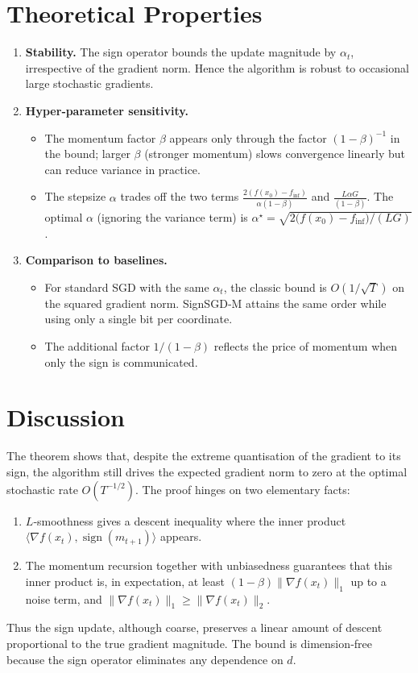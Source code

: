 \documentclass{article}
\begin{document}
\section*{Theoretical Properties}
\begin{enumerate}[nosep]
\item \textbf{Stability.} The sign operator bounds the update magnitude by $\alpha_t$, irrespective of the gradient norm. Hence the algorithm is robust to occasional large stochastic gradients.
\item \textbf{Hyper‑parameter sensitivity.}
   \begin{itemize}[nosep]
   \item The momentum factor $\beta$ appears only through the factor $(1-\beta)^{-1}$ in the bound; larger $\beta$ (stronger momentum) slows convergence linearly but can reduce variance in practice.
   \item The stepsize $\alpha$ trades off the two terms $\frac{2(f(x_0)-f_{\inf})}{\alpha(1-\beta)}$ and $\frac{L\alpha G}{(1-\beta)}$. The optimal $\alpha$ (ignoring the variance term) is $\alpha^\star = \sqrt{2\big(f(x_0)-f_{\inf}\big)/(LG)}$.
   \end{itemize}
\item \textbf{Comparison to baselines.}
   \begin{itemize}[nosep]
   \item For standard SGD with the same $\alpha_t$, the classic bound is $O(1/\sqrt{T})$ on the squared gradient norm. SignSGD‑M attains the same order while using only a single bit per coordinate.
   \item The additional factor $1/(1-\beta)$ reflects the price of momentum when only the sign is communicated.
   \end{itemize}
\end{enumerate}

\section*{Discussion}
The theorem shows that, despite the extreme quantisation of the gradient to its sign, the algorithm still drives the expected gradient norm to zero at the optimal stochastic rate $O(T^{-1/2})$. The proof hinges on two elementary facts:
\begin{enumerate}[nosep]
\item $L$‑smoothness gives a descent inequality where the inner product $\langle\nabla f(x_t),\operatorname{sign}(m_{t+1})\rangle$ appears.
\item The momentum recursion together with unbiasedness guarantees that this inner product is, in expectation, at least $(1-\beta)\|\nabla f(x_t)\|_1$ up to a noise term, and $\|\nabla f(x_t)\|_1\ge\|\nabla f(x_t)\|_2$.
\end{enumerate}
Thus the sign update, although coarse, preserves a linear amount of descent proportional to the true gradient magnitude. The bound is dimension‑free because the sign operator eliminates any dependence on $d$.
\end{document}
